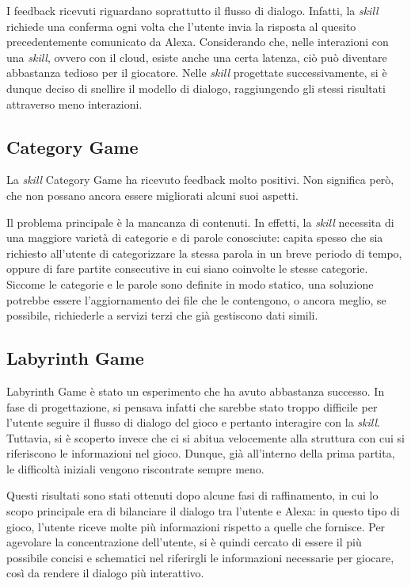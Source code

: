I feedback ricevuti riguardano soprattutto il flusso di dialogo. Infatti, la
\textit{skill} richiede una conferma ogni volta che l'utente invia la risposta
al quesito precedentemente comunicato da Alexa. Considerando che, nelle
interazioni con una \textit{skill}, ovvero con il cloud, esiste anche una certa
latenza, ciò può diventare abbastanza tedioso per il giocatore. Nelle
\textit{skill} progettate successivamente, si è dunque deciso di snellire il
modello di dialogo, raggiungendo gli stessi risultati attraverso meno
interazioni.

\subsection{Category Game}
\label{subsec:Section6.2.3}

La \textit{skill} Category Game ha ricevuto feedback molto positivi. Non
significa però, che non possano ancora essere migliorati alcuni suoi aspetti.

Il problema principale è la mancanza di contenuti. In effetti, la
\textit{skill} necessita di una maggiore varietà di categorie e di parole
conosciute: capita spesso che sia richiesto all'utente di categorizzare la
stessa parola in un breve periodo di tempo, oppure di fare partite consecutive
in cui siano coinvolte le stesse categorie. Siccome le categorie e le parole
sono definite in modo statico, una soluzione potrebbe essere l'aggiornamento
dei file che le contengono, o ancora meglio, se possibile, richiederle a
servizi terzi che già gestiscono dati simili.

\subsection{Labyrinth Game}
\label{subsec:Section6.2.4}

Labyrinth Game è stato un esperimento che ha avuto abbastanza successo. In fase
di progettazione, si pensava infatti che sarebbe stato troppo difficile per
l'utente seguire il flusso di dialogo del gioco e pertanto interagire con la
\textit{skill}. Tuttavia, si è scoperto invece che ci si abitua velocemente
alla struttura con cui si riferiscono le informazioni nel gioco. Dunque, già
all'interno della prima partita, le difficoltà iniziali vengono riscontrate
sempre meno.

Questi risultati sono stati ottenuti dopo alcune fasi di raffinamento, in cui
lo scopo principale era di bilanciare il dialogo tra l'utente e Alexa: in
questo tipo di gioco, l'utente riceve molte più informazioni rispetto a quelle
che fornisce. Per agevolare la concentrazione dell'utente, si è quindi cercato
di essere il più possibile concisi e schematici nel riferirgli le informazioni
necessarie per giocare, così da rendere il dialogo più interattivo.
